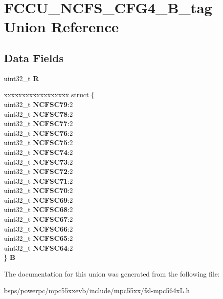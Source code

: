 \hypertarget{unionFCCU__NCFS__CFG4__32B__tag}{}\section{F\+C\+C\+U\+\_\+\+N\+C\+F\+S\+\_\+\+C\+F\+G4\+\_\+B\+\_\+tag Union Reference}
\label{unionFCCU__NCFS__CFG4__32B__tag}
\subsection*{Data Fields}
\begin{DoxyCompactItemize}
\item 
\mbox{\label{unionFCCU__NCFS__CFG4__32B__tag_a1cd9d94c56df037ea6ebc77e5cdf24b4}} 
uint32\+\_\+t {\bfseries R}
\item 
\mbox{\label{unionFCCU__NCFS__CFG4__32B__tag_a2f84a39e4b40a71f489f4ecae4658264}} 
\begin{tabbing}
xx\=xx\=xx\=xx\=xx\=xx\=xx\=xx\=xx\=\kill
struct \{\\
\>uint32\_t {\bfseries NCFSC79}:2\\
\>uint32\_t {\bfseries NCFSC78}:2\\
\>uint32\_t {\bfseries NCFSC77}:2\\
\>uint32\_t {\bfseries NCFSC76}:2\\
\>uint32\_t {\bfseries NCFSC75}:2\\
\>uint32\_t {\bfseries NCFSC74}:2\\
\>uint32\_t {\bfseries NCFSC73}:2\\
\>uint32\_t {\bfseries NCFSC72}:2\\
\>uint32\_t {\bfseries NCFSC71}:2\\
\>uint32\_t {\bfseries NCFSC70}:2\\
\>uint32\_t {\bfseries NCFSC69}:2\\
\>uint32\_t {\bfseries NCFSC68}:2\\
\>uint32\_t {\bfseries NCFSC67}:2\\
\>uint32\_t {\bfseries NCFSC66}:2\\
\>uint32\_t {\bfseries NCFSC65}:2\\
\>uint32\_t {\bfseries NCFSC64}:2\\
\} {\bfseries B}\\

\end{tabbing}\end{DoxyCompactItemize}


The documentation for this union was generated from the following file\+:\begin{DoxyCompactItemize}
\item 
bsps/powerpc/mpc55xxevb/include/mpc55xx/fsl-\/mpc564x\+L.\+h\end{DoxyCompactItemize}
